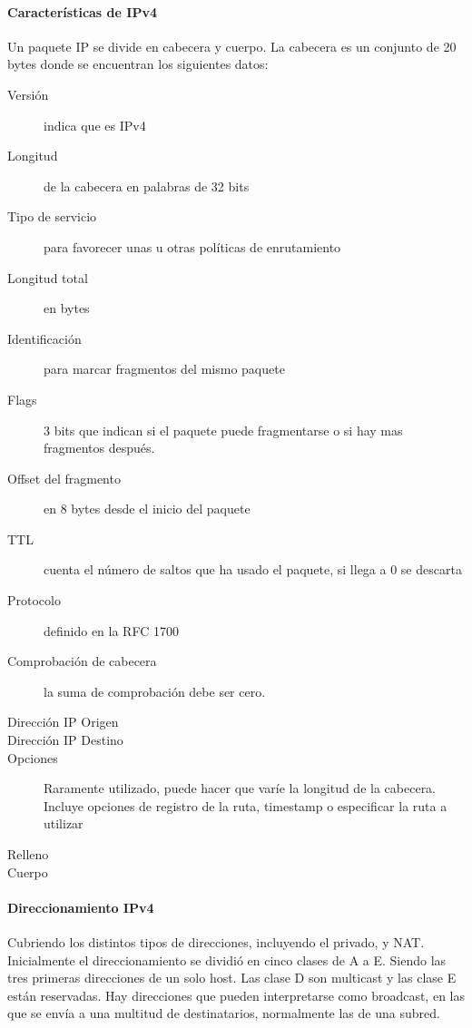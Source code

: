         \paragraph{Características de IPv4} %
            Un paquete IP se divide en cabecera y cuerpo. La cabecera es un conjunto de 20 bytes donde se encuentran los siguientes datos:
            \begin{description}
                \item[Versión] indica que es IPv4
                \item[Longitud] de la cabecera en palabras de 32 bits
                \item[Tipo de servicio] para favorecer unas u otras políticas de enrutamiento
                \item[Longitud total] en bytes
                \item[Identificación] para marcar fragmentos del mismo paquete
                \item[Flags] 3 bits que indican si el paquete puede fragmentarse o si hay mas fragmentos después.
                \item[Offset del fragmento] en 8 bytes desde el inicio del paquete
                \item[TTL] cuenta el número de saltos que ha usado el paquete, si llega a 0 se descarta
                \item[Protocolo] definido en la RFC 1700
                \item[Comprobación de cabecera] la suma de comprobación debe ser cero.
                \item[Dirección IP Origen]
                \item[Dirección IP Destino]
                \item[Opciones]Raramente utilizado, puede hacer que varíe la longitud de la cabecera. Incluye opciones de registro de la ruta, timestamp o especificar la ruta a utilizar
                \item[Relleno]
                \item[Cuerpo]
            \end{description}
        \paragraph{Direccionamiento IPv4} %
            Cubriendo los distintos tipos de direcciones, incluyendo el privado, y NAT. Inicialmente el direccionamiento se dividió en cinco clases de A a E. Siendo las tres primeras direcciones de un solo host. Las clase D son multicast y las clase E están reservadas. Hay direcciones que pueden interpretarse como broadcast, en las que se envía a una multitud de destinatarios, normalmente las de una subred.

